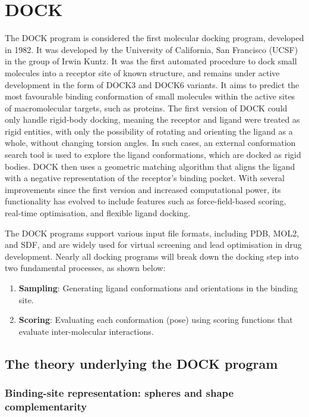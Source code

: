 \documentclass[12pt]{article}
\begin{document}
\section{DOCK}
The DOCK program is considered the first molecular docking program, developed in 1982\cite{CH7_Kuntz1982}. It was developed by the University of California, San Francisco (UCSF) in the group of Irwin Kuntz. It was the first automated procedure to dock small molecules into a receptor site of known structure, and remains under active development in the form of DOCK3 and DOCK6 variants\cite{CH7_Meng1992Grid,CH7_Allen2015,CH7_Brozell2012}. It aims to predict the most favourable binding conformation of small molecules within the active sites of macromolecular targets, such as proteins. The first version of DOCK could only handle rigid-body docking, meaning the receptor and ligand were treated as rigid entities, with only the possibility of rotating and orienting the ligand as a whole, without changing torsion angles. In such cases, an external conformation search tool is used to explore the ligand conformations, which are docked as rigid bodies. DOCK then uses a geometric matching algorithm that aligns the ligand with a negative representation of the receptor's binding pocket. With several improvements since the first version and increased computational power, its functionality has evolved to include features such as force-field-based scoring, real-time optimisation, and flexible ligand docking. 

The DOCK programs support various input file formats, including PDB, MOL2, and SDF, and are widely used for virtual screening and lead optimisation in drug development. Nearly all docking programs will break down the docking step into two fundamental processes, as shown below: 
\begin{enumerate}
  \item \textbf{Sampling}: Generating ligand conformations and orientations in the binding site.
  \item \textbf{Scoring}: Evaluating each conformation (pose) using scoring functions that evaluate inter-molecular interactions.
\end{enumerate}


\subsection{The theory underlying the DOCK program}

\subsubsection{Binding-site representation: spheres and shape complementarity}
\end{document}

